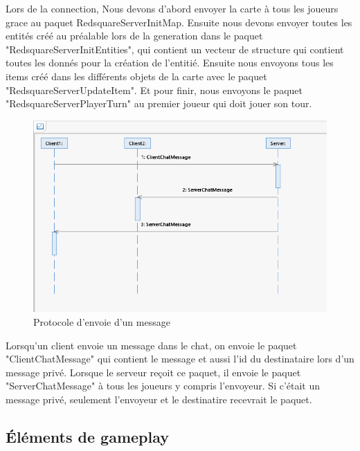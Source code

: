 \documentclass[a4paper, 12pt]{article}
\begin{document}
Lors de la connection, Nous devons d'abord envoyer la carte à tous les joueurs grace au paquet RedsquareServerInitMap. Ensuite nous devons envoyer toutes les entités créé au préalable lors de la generation dans le paquet "RedsquareServerInitEntities", qui contient un vecteur de structure qui contient toutes les donnés pour la création de l'entitié. Ensuite nous envoyons tous les items créé dans les différents objets de la carte avec le paquet "RedsquareServerUpdateItem". Et pour finir, nous envoyons le paquet "RedsquareServerPlayerTurn" au premier joueur qui doit jouer son tour.
\newpage
\begin{figure}[H]
    \includegraphics[scale=0.7]{./Diagramme/Chat}
    \caption{Protocole d'envoie d'un message}
\end{figure}
Lorsqu'un client envoie un message dans le chat, on envoie le paquet "ClientChatMessage" qui contient le message et aussi l'id du destinataire lors d'un message privé. Lorsque le serveur reçoit ce paquet, il envoie le paquet "ServerChatMessage" à tous les joueurs y compris l'envoyeur. Si c'était un message privé, seulement l'envoyeur et le destinatire recevrait le paquet.
\newpage

\subsection{Éléments de gameplay}
\end{document}

